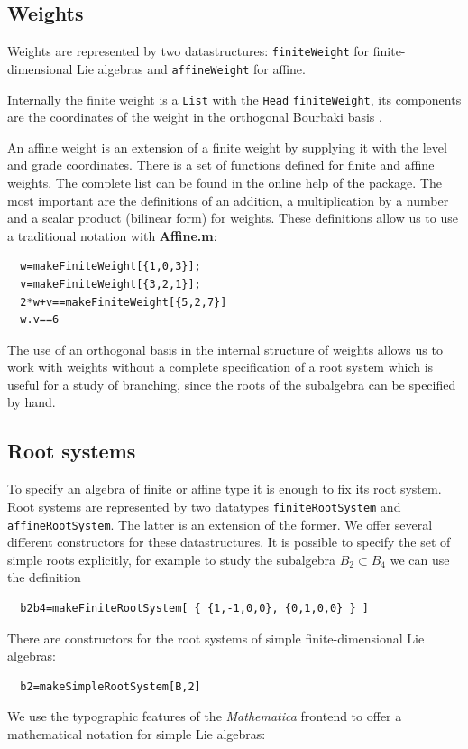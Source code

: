 \documentclass[preprint,12pt]{elsarticle}
\begin{document}
\subsection{Weights}
\label{sec:weights}

Weights are represented  by two datastructures: \lstinline{finiteWeight} for finite-dimensional Lie algebras and \lstinline{affineWeight}  for affine.

Internally the finite weight is a \lstinline{List} with the
\lstinline{Head} \lstinline{finiteWeight}, its components are the
coordinates of the weight in the orthogonal Bourbaki  basis
\cite{bourbaki2002lie}.

An affine weight is an extension of a finite weight by supplying it
with the level and grade coordinates. There is a set of functions
defined for finite and affine weights. The complete list can be
found in the  online help of the package. The most important
are the definitions of an addition, a multiplication by a number and a
scalar product (bilinear form) for weights. These definitions
allow us to use a traditional notation with {\bf Affine.m}:
\begin{lstlisting}
  w=makeFiniteWeight[{1,0,3}];
  v=makeFiniteWeight[{3,2,1}];
  2*w+v==makeFiniteWeight[{5,2,7}]
  w.v==6
\end{lstlisting}

The use of an orthogonal basis in the internal structure of weights allows us to work with weights without a complete specification of a root system which is useful for a study of branching, since the roots of the subalgebra can be specified by hand.

\subsection{Root systems}
\label{sec:root-systems}

To specify an algebra of finite or affine type it is enough to fix
its root system. Root systems are represented by two datatypes
\lstinline{finiteRootSystem} and \lstinline{affineRootSystem}. The
latter is an extension of the former. We offer several different
constructors for these datastructures. It is possible to specify
the set of simple roots explicitly, for example to study the
subalgebra $B_2\subset B_4$ we can use the definition
\begin{lstlisting}
  b2b4=makeFiniteRootSystem[ { {1,-1,0,0}, {0,1,0,0} } ]
\end{lstlisting}
There are constructors for the root systems of simple finite-dimensional Lie algebras:
\begin{lstlisting}
  b2=makeSimpleRootSystem[B,2]
\end{lstlisting}
We use the typographic features of the {\it Mathematica} frontend to offer a mathematical notation for simple Lie algebras:
\end{document}
